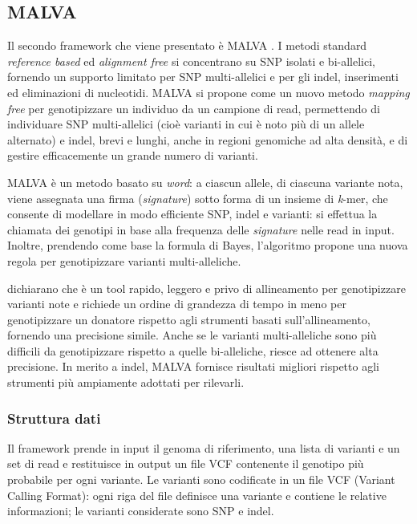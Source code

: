 \documentclass[../main.tex]{subfiles}
\begin{document}
\subsection{MALVA}
\label{malva}

Il secondo framework che viene presentato è MALVA \cite{bernardini2019malva}. I metodi standard \textit{reference based} ed \textit{alignment free} si concentrano su SNP isolati e bi-allelici, fornendo un supporto limitato per SNP multi-allelici e per gli indel, inserimenti ed eliminazioni di nucleotidi. MALVA si propone come un nuovo metodo \textit{mapping free} per genotipizzare un individuo da un campione di read, permettendo di individuare SNP multi-allelici (cioè varianti in cui è noto più di un allele alternato) e indel, brevi e lunghi, anche in regioni genomiche ad alta densità, e di gestire efficacemente un grande numero di varianti. 

MALVA è un metodo basato su \textit{word}: a ciascun allele, di ciascuna variante nota, viene assegnata una firma (\textit{signature}) sotto forma di un insieme di \textit{k}-mer, che consente di modellare in modo efficiente SNP, indel e varianti: si effettua la chiamata dei genotipi in base alla frequenza delle \textit{signature} nelle read in input. Inoltre, prendendo come base la formula di Bayes, l'algoritmo propone una nuova regola per genotipizzare varianti multi-alleliche.

\cite{bernardini2019malva} dichiarano che è un tool rapido, leggero e privo di allineamento per genotipizzare varianti note e richiede un ordine di grandezza di tempo in meno per genotipizzare un donatore rispetto agli strumenti basati sull'allineamento, fornendo una precisione simile. Anche se le varianti multi-alleliche sono più difficili da genotipizzare rispetto a quelle bi-alleliche, riesce ad ottenere alta precisione. In merito a indel, MALVA fornisce risultati migliori rispetto agli strumenti più ampiamente adottati per rilevarli. 


\subsubsection{Struttura dati}

Il framework prende in input il genoma di riferimento, una lista di varianti e un set di read e restituisce in output un file VCF contenente il genotipo più probabile per ogni variante. Le varianti sono codificate in un file VCF (Variant Calling Format): ogni riga del file definisce una variante e contiene le relative informazioni; le varianti considerate sono SNP e indel.
\end{document}
